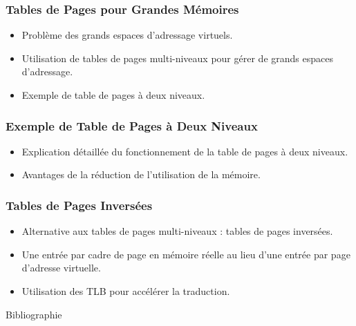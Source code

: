 \documentclass[10pt]{beamer}
\begin{document}
\begin{frame}
    \frametitle{Tables de Pages pour Grandes Mémoires}
    \begin{itemize}
        \item Problème des grands espaces d'adressage virtuels.
        \item Utilisation de tables de pages multi-niveaux pour gérer de grands
              espaces d'adressage.
        \item Exemple de table de pages à deux niveaux.
    \end{itemize}
\end{frame}

\begin{frame}
    \frametitle{Exemple de Table de Pages à Deux Niveaux}
    \begin{itemize}
        \item Explication détaillée du fonctionnement de la table de pages à
              deux
              niveaux.
        \item Avantages de la réduction de l'utilisation de la mémoire.
    \end{itemize}
\end{frame}

\begin{frame}
    \frametitle{Tables de Pages Inversées}
    \begin{itemize}
        \item Alternative aux tables de pages multi-niveaux : tables de pages
              inversées.
        \item Une entrée par cadre de page en mémoire réelle au lieu d'une
              entrée
              par page d'adresse virtuelle.
        \item Utilisation des TLB pour accélérer la traduction.
    \end{itemize}
\end{frame}


\begin{frame}{Bibliographie}
    

\end{frame}
\end{document}
